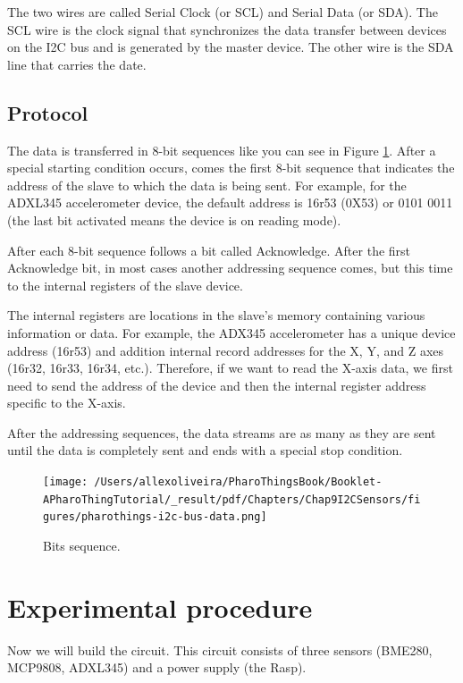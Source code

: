 \documentclass[10pt,twoside,english]{_support/latex/sbabook/sbabook}
\begin{document}
The two wires are called Serial Clock (or SCL) and Serial Data (or SDA). The SCL wire is the clock signal that synchronizes the data transfer between devices on the I2C bus and is generated by the master device. The other wire is the SDA line that carries the date.
\subsection{Protocol}
The data is transferred in 8-bit sequences like you can see in Figure \ref{I2CBusPacket}. After a special starting condition occurs, comes the first 8-bit sequence that indicates the address of the slave to which the data is being sent.
For example, for the ADXL345 accelerometer device, the default address is 16r53 (0X53) or 0101 0011 (the last bit activated means the device is on reading mode).

After each 8-bit sequence follows a bit called Acknowledge. After the first Acknowledge bit, in most cases another addressing sequence comes, but this time to the internal registers of the slave device. 

The internal registers are locations in the slave's memory containing various information or data. For example, the ADX345 accelerometer has a unique device address (16r53) and addition internal record addresses for the X, Y, and Z axes (16r32, 16r33, 16r34, etc.). Therefore, if we want to read the X-axis data, we first need to send the address of the device and then the internal register address specific to the X-axis.

After the addressing sequences, the data streams are as many as they are sent until the data is completely sent and ends with a special stop condition.


\begin{figure}

\begin{center}
\texttt{[image: /Users/allexoliveira/PharoThingsBook/Booklet-APharoThingTutorial/\_result/pdf/Chapters/Chap9I2CSensors/figures/pharothings-i2c-bus-data.png]}\caption{Bits sequence.\label{I2CBusPacket}}\end{center}
\end{figure}

\section{Experimental procedure}
Now we will build the circuit. This circuit consists of three sensors (BME280, MCP9808, ADXL345) and a power supply (the Rasp).
\end{document}
